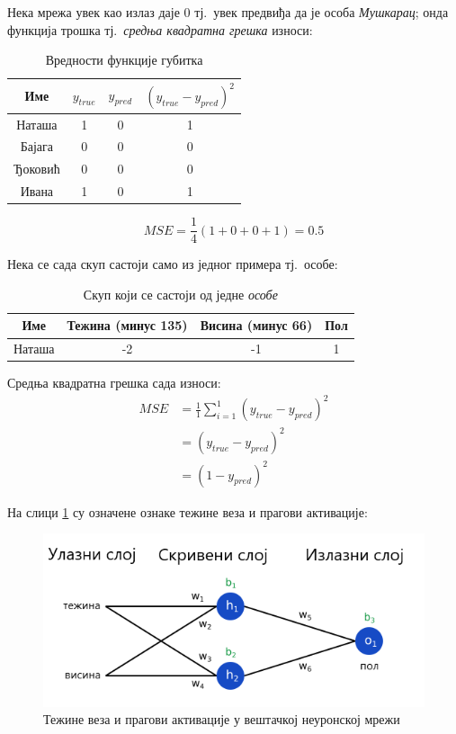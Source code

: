 \documentclass[12pt, а4paper]{article}
\begin{document}
Нека мрежа увек као излаз даје $0$ тј.\ увек предвиђа да је особа \textit{Мушкарац};
онда функција трошка тј.\ \textit{средња квадратна грешка} износи:
\begin{table}[ht]
\centering
 \begin{tabular}{| c | c | c | c |}
  \hline
  Име & $y_{true}$ & $y_{pred}$ & $(y_{true} - y_{pred})^2$ \\
  \hline
  Наташа & 1 & 0 & 1\\
  Бајага & 0 & 0 & 0\\
  Ђоковић & 0 & 0 & 0\\
  Ивана & 1 & 0 & 1\\
  \hline
 \end{tabular}
 \caption{Вредности функције губитка}
 \label{tab:primerSkupa}
\end{table}

\begin{equation}
MSE = \frac{1}{4} (1 + 0 + 0 + 1) = 0.5
\end{equation}

Нека се сада скуп састоји само из једног примера тј.\ особе:
\begin{table}[ht]
 \centering
 \begin{tabular}{| c | c | c | c |}
  \hline
  Име & Тежина (минус 135) & Висина (минус 66) & Пол \\
  \hline
  Наташа & -2 & -1 & 1\\
  \hline
 \end{tabular}
 \caption{Скуп који се састоји од једне \textit{особе}}
 \label{tab:natasa}
\end{table}

Средња квадратна грешка сада износи:
\begin{equation}
\begin{split}
MSE & = \frac{1}{1} \sum_{i=1}^{1} (y_{true} - y_{pred})^2 \\
& = (y_{true} - y_{pred})^2 \\
& = (1 - y_{pred})^2
\end{split}
\end{equation}

На слици \ref{fig:nn_osnovaOznake} су означене ознаке тежине веза
и прагови активације:
\begin{figure}[H]
  \centering
      \includegraphics[scale=0.6]{slike/neuronskaMrezaOznake.png}
  \caption{Тежине веза и прагови активације у вештачкој неуронској мрежи}
  \label{fig:nn_osnovaOznake}
\end{figure}
\end{document}
